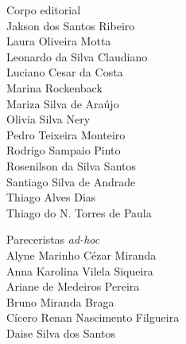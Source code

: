 {\begin{minipage}[t]{.5\textwidth}
\raggedright
Corpo editorial\\
\hspace{1.5em}Jakson dos Santos Ribeiro\\
\hspace{1.5em}Laura Oliveira Motta\\
\hspace{1.5em}Leonardo da Silva Claudiano\\
\hspace{1.5em}Luciano Cesar da Costa\\
\hspace{1.5em}Marina Rockenback\\
\hspace{1.5em}Mariza Silva de Araújo\\
\hspace{1.5em}Olivia Silva Nery\\
\hspace{1.5em}Pedro Teixeira Monteiro\\
\hspace{1.5em}Rodrigo Sampaio Pinto\\
\hspace{1.5em}Rosenilson da Silva Santos\\
\hspace{1.5em}Santiago Silva de Andrade\\
\hspace{1.5em}Thiago Alves Dias\\
\hspace{1.5em}Thiago do N. Torres de Paula
\end{minipage}%
\begin{minipage}[t]{.5\textwidth}
\raggedright
Pareceristas \textit{ad-hoc}\\
\hspace{1.5em}Alyne Marinho Cézar Miranda\\
\hspace{1.5em}Anna Karolina Vilela Siqueira\\
\hspace{1.5em}Ariane de Medeiros Pereira\\
\hspace{1.5em}Bruno Miranda Braga\\
\hspace{1.5em}Cícero Renan Nascimento Filgueira\\
\hspace{1.5em}Daise Silva dos Santos\\

\end{minipage}}
